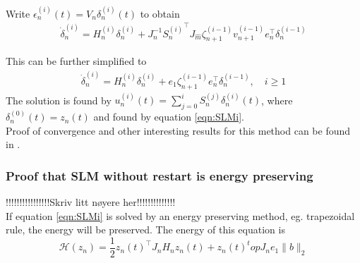 Write $ \epsilon^{(i)}_n(t)  = V_n \delta_n^{(i)}(t) $ to obtain
\begin{equation}
\begin{aligned}
\dot{\delta}_n^{(i)} = H_n^{(i)} \delta_n^{(i)} + J^{-1}_n {S_n^{(i)}}^\top J_{\hat{m}} \zeta_{n+1}^{(i-1)}v_{n+1}^{(i-1)} e_n^\top \delta_n^{(i-1)}
\end{aligned}
\end{equation}

This can be further simplified to
\begin{equation}
\begin{aligned}
\dot{\delta}_n^{(i)} = H_n^{(i)} \delta_n^{(i)} + e_1 \zeta_{n+1}^{(i-1)} e_n^\top \delta_n^{(i-1)}, \quad i \geq 1
\label{eqn:SLMr}
\end{aligned}
\end{equation}
The solution is found by $ u_n^{(i)}(t) = \sum \limits_{j = 0} ^i S_n^{(j)} \delta_n^{(i)} (t) $, where $\delta_n^{(0)} (t) = z_n(t)$ and found by equation \eqref{eqn:SLMi}. \\

Proof of convergence and other interesting results for this method can be found in \citep{!!!!!!!!!!!}. 

\subsubsection{Proof that SLM without restart is energy preserving} %
!!!!!!!!!!!!!!!!Skriv litt nøyere her!!!!!!!!!!!!!!\\
If equation \eqref{eqn:SLMi} is solved by an energy preserving method, eg. trapezoidal rule, the energy will be preserved. The energy of this equation is
\begin{equation}
\mathcal{H}(z_n) = \frac{1}{2}z_n(t)^\top J_n H_n z_n(t) + z_n(t)^top J_n e_1 \|b \|_2
\end{equation}

